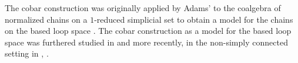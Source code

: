 The cobar construction was originally applied by Adams' to the coalgebra of normalized chains on a $1$-reduced simplicial set to obtain a model for the chains on the based loop space \cite{Adams}. The cobar construction as a model for the based loop space was furthered studied in \cite{Baues} and more recently, in the non-simply connected setting in \cite{Hess-Tonks}, \cite{Rivera-Zeinalian}.
